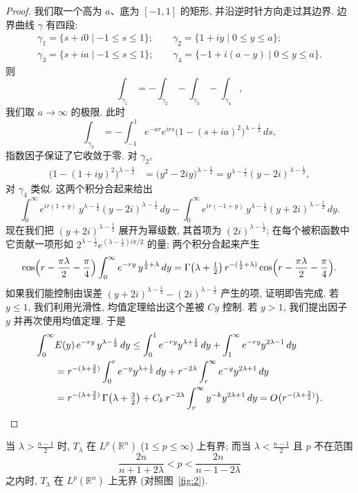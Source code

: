 \begin{proof}
我们取一个高为 $a$、底为 $[-1,1]$ 的矩形, 并沿逆时针方向走过其边界. 边界曲线 $\gamma$ 有四段:
\begin{gather*}
\gamma_{1}=\{s+i0 \mid -1\leq s\leq 1\};\qquad \gamma_{2}=\{1+iy \mid 0\leq y\leq a\}; \\
\gamma_{3}=\{s+ia \mid -1\leq s\leq 1\};\qquad \gamma_{4}=\{-1+i(a-y) \mid 0\leq y\leq a\}.
\end{gather*}
则
\[
\int_{\gamma_{1}}=-\int_{\gamma_{2}}-\int_{\gamma_{3}}-\int_{\gamma_{4}},
\]
我们取 $a\to\infty$ 的极限. 此时
\[
\int_{\gamma_{3}}=-\int_{-1}^{1}e^{-ar}e^{irs}\bigl(1-(s+ia)^{2}\bigr)^{\lambda-\frac{1}{2}}\,ds,
\]
指数因子保证了它收敛于零. 对 $\gamma_{2}$,
\begin{align*}
\bigl(1-(1+iy)^{2}\bigr)^{\lambda-\frac{1}{2}}
&=\bigl(y^{2}-2iy\bigr)^{\lambda-\frac{1}{2}}
=y^{\lambda-\frac{1}{2}}(y-2i)^{\lambda-\frac{1}{2}},
\end{align*}
对 $\gamma_{4}$ 类似. 这两个积分合起来给出
\[
\int_{0}^{\infty}e^{ir(1+y)}\,y^{\lambda-\frac{1}{2}}(y-2i)^{\lambda-\frac{1}{2}}\,dy
-\int_{0}^{\infty}e^{ir(-1+y)}\,y^{\lambda-\frac{1}{2}}(y+2i)^{\lambda-\frac{1}{2}}\,dy.
\]
现在我们把 $(y+2i)^{\lambda-\frac{1}{2}}$ 展开为幂级数, 其首项为 $(2i)^{\lambda-\frac{1}{2}}$; 在每个被积函数中它贡献一项形如 $2^{\lambda-\frac{1}{2}}e^{(\lambda-\frac{1}{2})i\pi/2}$ 的量; 两个积分合起来产生
\[
\cos\Bigl(r-\frac{\pi\lambda}{2}-\frac{\pi}{4}\Bigr)\int_{0}^{\infty}e^{-ry}\,y^{\frac{1}{2}+\lambda}\,dy
=\Gamma\bigl(\lambda+\tfrac{1}{2}\bigr)\,r^{-(\frac{1}{2}+\lambda)}\cos\Bigl(r-\frac{\pi\lambda}{2}-\frac{\pi}{4}\Bigr).
\]
如果我们能控制由误差 $(y+2i)^{\lambda-\frac{1}{2}}-(2i)^{\lambda-\frac{1}{2}}$ 产生的项, 证明即告完成. 若 $y\leq 1$, 我们利用光滑性, 均值定理给出这个差被 $Cy$ 控制. 若 $y>1$, 我们提出因子 $y$ 并再次使用均值定理. 于是
\begin{align*}
\int_{0}^{\infty}&E(y)\,e^{-ry}\,y^{\lambda-\frac{1}{2}}\,dy
\leq\int_{0}^{1}e^{-ry}y^{\lambda+\frac{1}{2}}\,dy+\int_{1}^{\infty}e^{-ry}y^{2\lambda-1}\,dy \\
&=r^{-(\lambda+\frac{3}{2})}\int_{0}^{r}e^{-y}y^{\lambda+\frac{1}{2}}\,dy
+r^{-2\lambda}\int_{r}^{\infty}e^{-y}y^{2\lambda+1}\,dy \\
&=r^{-(\lambda+\frac{3}{2})}\,\Gamma\bigl(\lambda+\tfrac{3}{2}\bigr)
+C_{k}\,r^{-2\lambda}\int_{r}^{\infty}y^{-k}y^{2\lambda+1}\,dy
=O\bigl(r^{-(\lambda+\frac{3}{2})}\bigr). \qedhere
\end{align*}
\end{proof}

\begin{corollary}\label{cor:5.4}
当 $\lambda>\frac{n-1}{2}$ 时, $T_\lambda$ 在 $L^p(\mathbb{R}^n)$ ($1\leq p\leq\infty$) 上有界; 而当 $\lambda<\frac{n-1}{2}$ 且 $p$ 不在范围
\[
\frac{2n}{n+1+2\lambda}<p<\frac{2n}{n-1-2\lambda}
\]
之内时, $T_\lambda$ 在 $L^p(\mathbb{R}^n)$ 上无界 (对照图~\ref{fig:2}).
\end{corollary}

